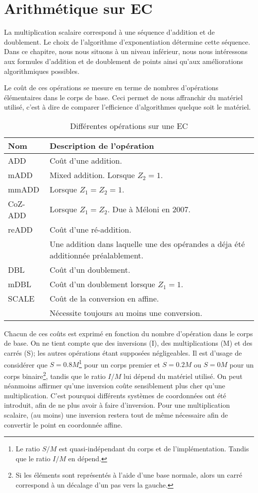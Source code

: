 \chapter{Arithmétique sur EC}
La multiplication scalaire correspond à une séquence d'addition et de doublement. Le choix de l'algorithme d'exponentiation détermine cette séquence. Dans ce chapitre, nous nous situons à un niveau inférieur, nous nous intéressons aux formules d'addition et de doublement de points ainsi qu'aux améliorations algorithmiques possibles. 

Le coût de ces opérations se mesure en terme de nombres d'opérations élémentaires dans le corps de base. Ceci permet de nous affranchir du matériel utilisé, c'est à dire de comparer l'efficience d'algorithmes quelque soit le matériel.

\begin{table}[h]
\centering
    \begin{tabular}{|l|l|}
     Nom & Description de l'opération \\
     \hline \hline
     ADD & Coût d'une addition.\\
     mADD & Mixed addition. Lorsque $Z_2 = 1$.\\
     mmADD & Lorsque $Z_1 = Z_2 = 1$.\\
     CoZ-ADD & Lorsque $Z_1 = Z_2$. Due à Méloni en 2007. \\
     reADD & Coût d'une ré-addition. \\
      & Une addition dans laquelle une des opérandes a déja été additionnée préalablement. \\
     \hline
     DBL & Coût d'un doublement.\\
     mDBL & Coût d'un doublement lorsque $Z_1 = 1.$\\
     \hline
     SCALE & Coût de la conversion en affine.\\
     & Nécessite toujours au moins une conversion.\\
     \hline
    \end{tabular}
\caption{Différentes opérations sur une EC}
\label{tab:operation}
\end{table}

Chacun de ces coûts est exprimé en fonction du nombre d'opération dans le corps de base. On ne tient compte que des inversions (I), des multiplications (M) et des carrés (S); les autres opérations étant supposées négligeables. Il est d'usage de considérer que $S = 0.8M$\footnote{Le ratio $S/M$ est quasi-indépendant du corps et de l'implémentation. Tandis que le ratio $I/M$ en dépend.} pour un corps premier et $S = 0.2 M$ ou $S = 0M$ pour un corps binaire\footnote{Si les éléments sont représentés à l'aide d'une base normale, alors un carré correspond à un décalage d'un pas vers la gauche.}, tandis que le ratio $I/M$ lui dépend du matériel utilisé. On peut néanmoins affirmer qu'une inversion coûte sensiblement plus cher qu'une multiplication. C'est pourquoi différents systèmes de coordonnées ont été introduit, afin de ne plus avoir à faire d'inversion. Pour une multiplication scalaire, (au moins) une inversion restera tout de même nécessaire afin de convertir le point en coordonnée affine.

